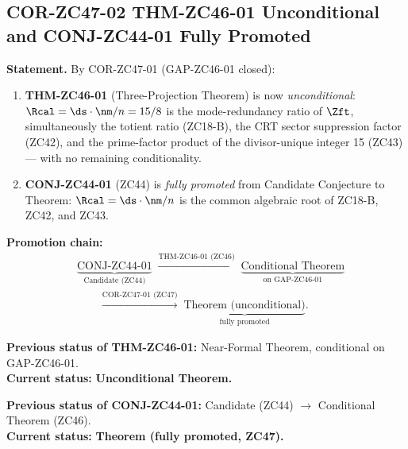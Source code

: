\documentclass[12pt, a4paper]{article}
\begin{document}
\subsection{COR-ZC47-02 \quad THM-ZC46-01 Unconditional
  and CONJ-ZC44-01 Fully Promoted}
\label{sec:cor02}


\begin{formalbox}[title={COR-ZC47-02: Three-Projection Theorem
  Unconditional; CONJ-ZC44-01 Fully Promoted}]
\textbf{Statement.}
By COR-ZC47-01 (GAP-ZC46-01 closed):
\begin{enumerate}[leftmargin=*, noitemsep]
  \item \textbf{THM-ZC46-01} (Three-Projection Theorem) is now
    \emph{unconditional}: $\Rcal = \ds\cdot\nm/n = 15/8$ is the
    mode-redundancy ratio of $\Zft$, simultaneously the totient
    ratio (ZC18-B), the CRT sector suppression factor (ZC42),
    and the prime-factor product of the divisor-unique integer 15
    (ZC43) --- with no remaining conditionality.
  \item \textbf{CONJ-ZC44-01} (ZC44) is \emph{fully promoted}
    from Candidate Conjecture to Theorem:
    $\Rcal = \ds\cdot\nm/n$ is the common algebraic root of
    ZC18-B, ZC42, and ZC43.
\end{enumerate}

\textbf{Promotion chain:}
\begin{align*}
  &\underbrace{\text{CONJ-ZC44-01}}_{\text{Candidate (ZC44)}}
  \;\xrightarrow{\text{THM-ZC46-01 (ZC46)}}\;
  \underbrace{\text{Conditional Theorem}}_{\text{on GAP-ZC46-01}}\\
  &\qquad\xrightarrow{\text{COR-ZC47-01 (ZC47)}}\;
  \underbrace{\text{Theorem (unconditional)}}_{\text{fully promoted}}.
\end{align*}

\textbf{Previous status of THM-ZC46-01:}
Near-Formal Theorem, conditional on GAP-ZC46-01.\\
\textbf{Current status:}
\textbf{Unconditional Theorem.}

\textbf{Previous status of CONJ-ZC44-01:}
Candidate (ZC44) $\to$ Conditional Theorem (ZC46).\\
\textbf{Current status:}
\textbf{Theorem (fully promoted, ZC47).}
\end{formalbox}

\end{document}
